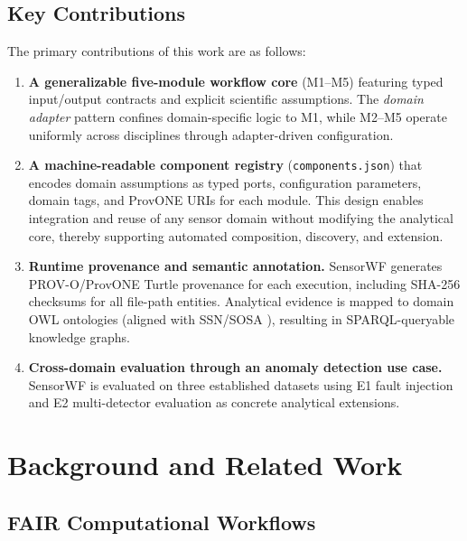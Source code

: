 \documentclass[conference]{IEEEtran}
\begin{document}
\subsection{Key Contributions}

The primary contributions of this work are as follows:

\begin{enumerate}
  \item \textbf{A generalizable five-module workflow core} (M1--M5) featuring typed input/output contracts and explicit scientific assumptions. The \emph{domain adapter} pattern confines domain-specific logic to M1, while M2--M5 operate uniformly across disciplines through adapter-driven configuration.

  \item \textbf{A machine-readable component registry} (\texttt{components.json}) that encodes domain assumptions as typed ports, configuration parameters, domain tags, and ProvONE URIs for each module. This design enables integration and reuse of any sensor domain without modifying the analytical core, thereby supporting automated composition, discovery, and extension.

  \item \textbf{Runtime provenance and semantic annotation.} SensorWF generates PROV-O/ProvONE Turtle provenance for each execution, including SHA-256 checksums for all file-path entities. Analytical evidence is mapped to domain OWL ontologies (aligned with SSN/SOSA \cite{haller2019ssn,compton2012ssn}), resulting in SPARQL-queryable knowledge graphs.

  \item \textbf{Cross-domain evaluation through an anomaly detection use case.} SensorWF is evaluated on three established datasets using E1 fault injection and E2 multi-detector evaluation as concrete analytical extensions.
  \end{enumerate}


\section{Background and Related Work}
\label{sec:background}

\subsection{FAIR Computational Workflows}
\end{document}
